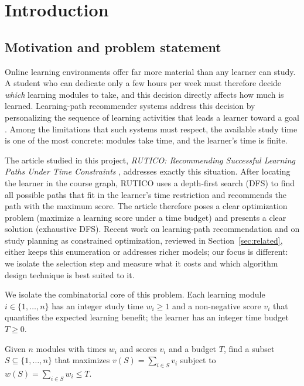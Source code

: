 \section{Introduction}\label{sec:intro}

\subsection{Motivation and problem statement}

Online learning environments offer far more material than any learner can study. A student who can dedicate only a few hours per week must therefore decide \emph{which} learning modules to take, and this decision directly affects how much is learned. Learning-path recommender systems address this decision by personalizing the sequence of learning activities that leads a learner toward a goal \cite{nabizadeh2020survey}. Among the limitations that such systems must respect, the available study time is one of the most concrete: modules take time, and the learner's time is finite.

The article studied in this project, \emph{RUTICO: Recommending Successful Learning Paths Under Time Constraints} \cite{nabizadeh2017rutico}, addresses exactly this situation. After locating the learner in the course graph, RUTICO uses a depth-first search (DFS) to find all possible paths that fit in the learner's time restriction and recommends the path with the maximum score. The article therefore poses a clear optimization problem (maximize a learning score under a time budget) and presents a clear solution (exhaustive DFS). Recent work on learning-path recommendation and on study planning as constrained optimization, reviewed in Section~\ref{sec:related}, either keeps this enumeration or addresses richer models; our focus is different: we isolate the selection step and measure what it costs and which algorithm design technique is best suited to it.

We isolate the combinatorial core of this problem. Each learning module $i \in \{1,\dots,n\}$ has an integer study time $w_i \ge 1$ and a non-negative score $v_i$ that quantifies the expected learning benefit; the learner has an integer time budget $T \ge 0$.

\begin{definition}\label{def:lps}
Given $n$ modules with times $w_i$ and scores $v_i$ and a budget $T$, find a subset $S \subseteq \{1,\dots,n\}$ that maximizes $v(S)=\sum_{i\in S} v_i$ subject to $w(S)=\sum_{i\in S} w_i \le T$.
\end{definition}

